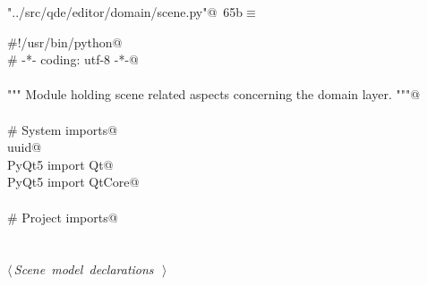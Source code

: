 \documentclass[
    a4paper,      %
    10pt,         %
    openright,    %
    notitlepage,  %
    parskip=half, %
]{scrreprt}       %
\theoremstyle{definition}                    %
\begin{document}
\begin{flushleft} \small
\begin{minipage}{\linewidth}\label{scrap110}\raggedright\small
{} \verb@"../src/qde/editor/domain/scene.py"@\nobreak\ {\footnotesize {65b}}$\equiv$
\vspace{-1ex}
\begin{list}{}{} \item
\mbox{}\lstinline@#!/usr/bin/python@\\
\mbox{}\lstinline@# -*- coding: utf-8 -*-@\\
\mbox{}\lstinline@@\\
\mbox{}\lstinline@""" Module holding scene related aspects concerning the domain layer. """@\\
\mbox{}\lstinline@@\\
\mbox{}\lstinline@# System imports@\\
\mbox{}\lstinline@import uuid@\\
\mbox{}\lstinline@from PyQt5 import Qt@\\
\mbox{}\lstinline@from PyQt5 import QtCore@\\
\mbox{}\lstinline@@\\
\mbox{}\lstinline@# Project imports@\\
\mbox{}\lstinline@@\\
\mbox{}\lstinline@@\\
\mbox{}\lstinline@@\hbox{$\langle\,${\itshape Scene model declarations}\nobreak\ {\footnotesize {}}$\,\rangle$}\lstinline@@\\
\mbox{}\lstinline@@{\NWsep}
\end{list}
\vspace{-1.5ex}
\footnotesize
\begin{list}{}{\setlength{\itemsep}{-\parsep}\setlength{\itemindent}{-\leftmargin}}

\item{}
\end{list}
\end{minipage}\vspace{4ex}
\end{flushleft}
\end{document}
